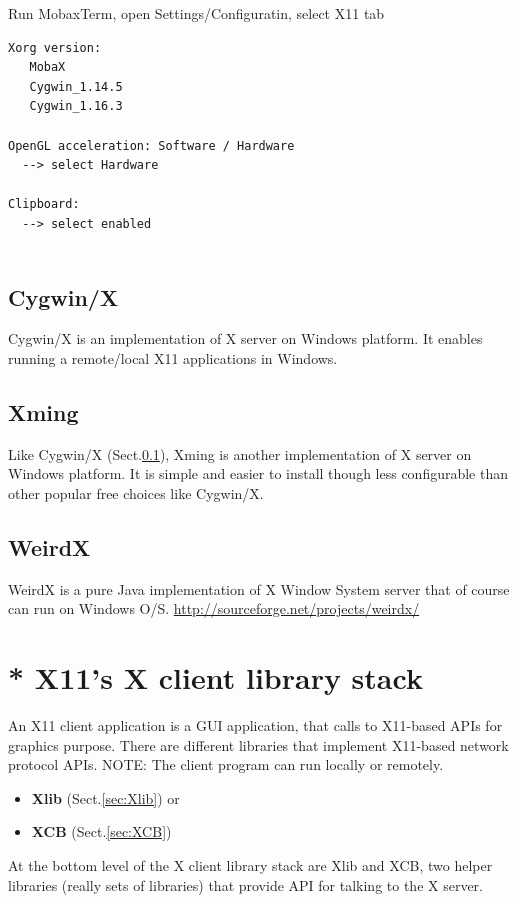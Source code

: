Run MobaxTerm, open Settings/Configuratin, select X11 tab
\begin{verbatim}
Xorg version:
   MobaX
   Cygwin_1.14.5
   Cygwin_1.16.3
   
OpenGL acceleration: Software / Hardware
  --> select Hardware
  
Clipboard: 
  --> select enabled
  
\end{verbatim}


\subsection{Cygwin/X}
\label{sec:Cygwin/X}

Cygwin/X is an implementation of X server on Windows platform. It enables
running a remote/local X11 applications in Windows.

\subsection{Xming}
\label{sec:Xming}

Like Cygwin/X (Sect.\ref{sec:Cygwin/X}), Xming is another implementation of X
server on Windows platform. It is simple and easier to install though less
configurable than other popular free choices like Cygwin/X.

\subsection{WeirdX}
\label{sec:WeirdX}

WeirdX is a pure Java implementation of X Window System server that of course
can run on Windows O/S.
\url{http://sourceforge.net/projects/weirdx/}


\section{ * X11's X client library stack}
\label{sec:X-client-implementation}

An X11 client application is a GUI application, that calls to X11-based APIs
for graphics purpose. There are different libraries that implement X11-based
network protocol APIs. NOTE: The client program can run locally or remotely. 
\begin{itemize}
  \item {\bf Xlib} (Sect.\ref{sec:Xlib}) or 
  
  \item {\bf XCB} (Sect.\ref{sec:XCB})
\end{itemize}
At the bottom level of the X client library stack are Xlib and XCB, two helper
libraries (really sets of libraries) that provide API for talking to the X server. 

